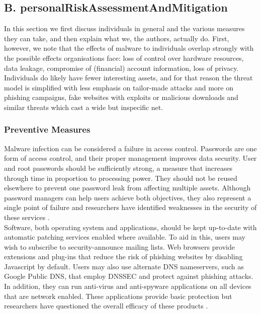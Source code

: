 \documentclass[a4paper]{llncs}
\begin{document}
\subsection{B. personalRiskAssessmentAndMitigation}
In this section we first discuss individuals in general and the various measures they can take, and then explain what we, the authors, actually do. First, however, we note that the effects of malware to individuals overlap strongly with the possible effects organisations face: loss of control over hardware resources, data leakage, compromise of (financial) account information, loss of privacy. Individuals do likely have fewer interesting assets, and for that reason the threat model is simplified with less emphasis on tailor-made attacks and more on phishing campaigns, fake websites with exploits or malicious downloads and similar threats which cast a wide but inspecific net.

\subsubsection{Preventive Measures}
Malware infection can be considered a failure in access control. Passwords are one form of access control, and their proper management improves data security. User and root passwords should be sufficiently strong, a measure that increases through time in proportion to processing power. They should not be reused elsewhere to prevent one password leak from affecting multiple assets. Although password managers can help users achieve both objectives, they also represent a single point of failure and researchers have identified weaknesses in the security of these services \cite{zhao2013vulnerability}.\\

Software, both operating system and applications, should be kept up-to-date with automatic patching services enabled where available. To aid in this, users may wish to subscribe to security-announce mailing lists. Web browsers provide extensions and plug-ins that reduce the risk of phishing websites by disabling Javascript by default. Users may also use alternate DNS nameservers, such as Google Public DNS, that employ DNSSEC and protect against phishing attacks. In addition, they can run anti-virus and anti-spyware applications on all devices that are network enabled. These applications provide basic protection but researchers have questioned the overall efficacy of these products \cite{goodin2014avdead}.\\
\end{document}
